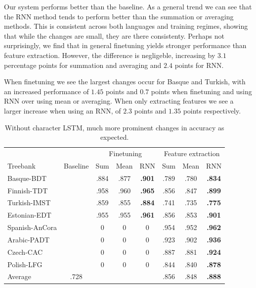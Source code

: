 \documentclass[11pt]{article}
\begin{document}
        Our system performs better than the baseline. As a
     general trend we can see that the RNN method tends to perform
     better than the summation or averaging methods. This is
     consistent across both languages and training regimes, showing
     that while the changes are small, they are there consistenty.
            Perhaps not surprisingly, we find that in general
     finetuning yields stronger performance than feature
     extraction. However, the difference is negligeble, increasing by
     $3.1$ percentage points for summation and averaging and $2.4$
     points for RNN.

     When finetuning we see the largest changes occur for Basque and
     Turkish, with an increased performance of $1.45$ points and $0.7$
     points when finetuning and using RNN over using mean or
     averaging. When only extracting features we see a larger
     increase when using an RNN, of $2.3$ points and $1.35$ points
     respectively.

	\begin{table}%
	\centering
	\begin{tabular}{l|c|ccc|ccc}
		& & \multicolumn{3}{c}{Finetuning} & \multicolumn{3}{c}{Feature extraction} \\
		Treebank & Baseline & Sum & Mean & RNN & Sum & Mean & RNN \\
		\hline
		Basque-BDT      & & .884 & .877 & \textbf{.901} & .789 & .780 & \textbf{.834} \\
		Finnish-TDT     & & .958 & .960 & \textbf{.965} & .856 & .847 & \textbf{.899} \\
		Turkish-IMST    & & .859 & .855 & \textbf{.884} & .741 & .735 & \textbf{.775} \\
		Estonian-EDT    & & .955 & .955 & \textbf{.961} & .856 & .853 & \textbf{.901} \\
		Spanish-AnCora  & & 0 & 0 & 0 & .954 & .952 & \textbf{.962} \\
		Arabic-PADT     & & 0 & 0 & 0 & .923 & .902 & \textbf{.936} \\
		Czech-CAC       & & 0 & 0 & 0 & .887 & .881 & \textbf{.924} \\
		Polish-LFG      & & 0 & 0 & 0 & .844 & .840 & \textbf{.878} \\
        \hline
        Average         & .728 &  &  &  & .856 & .848 & \textbf{.888} \\
	\end{tabular}
	\caption{\label{tab:results_tokens_nochars} Without character LSTM, much more prominent changes in accuracy as expected.}
    \end{table}
\end{document}
